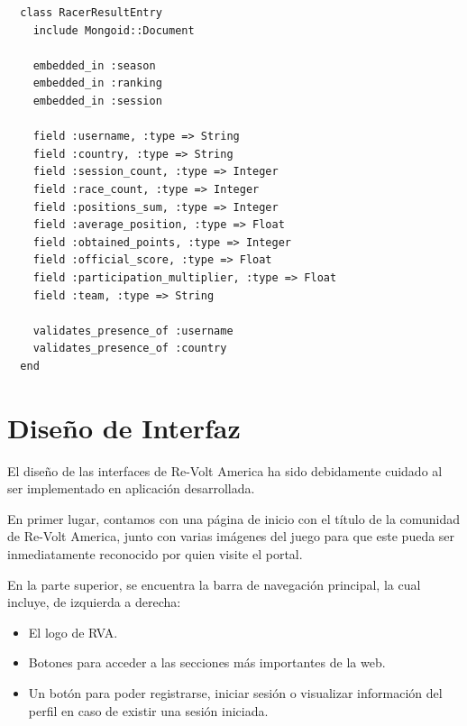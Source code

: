 \begin{listing}
  \begin{verbatim}
  class RacerResultEntry
    include Mongoid::Document
    
    embedded_in :season
    embedded_in :ranking
    embedded_in :session
    
    field :username, :type => String
    field :country, :type => String
    field :session_count, :type => Integer
    field :race_count, :type => Integer
    field :positions_sum, :type => Integer
    field :average_position, :type => Float
    field :obtained_points, :type => Integer
    field :official_score, :type => Float
    field :participation_multiplier, :type => Float
    field :team, :type => String
    
    validates_presence_of :username
    validates_presence_of :country
  end
  \end{verbatim}
\end{listing}

\clearpage

\section{Diseño de Interfaz}
El diseño de las interfaces de Re-Volt America ha sido debidamente cuidado al ser implementado en aplicación desarrollada.

En primer lugar, contamos con una página de inicio con el título de la comunidad de Re-Volt America, junto con varias imágenes del juego para que este pueda ser inmediatamente reconocido por quien visite el portal.

En la parte superior, se encuentra la barra de navegación principal, la cual incluye, de izquierda a derecha:
\begin{itemize}
  \item El logo de RVA.
  \item Botones para acceder a las secciones más importantes de la web.
  \item Un botón para poder registrarse, iniciar sesión o visualizar información del perfil en caso de existir una sesión iniciada.
\end{itemize}

